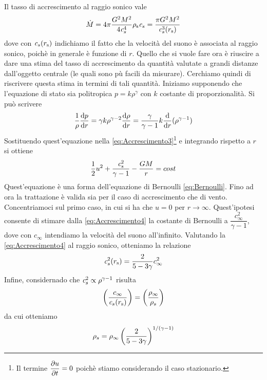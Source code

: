 Il tasso di accrescimento al raggio sonico vale
\begin{equation}
\dot{M} = 4\pi \dfrac{G^2M^2}{4\textit{c}_{s}^4} \rho_\mathrm{s} \textit{c}_{s} = \dfrac{\pi G^2 M^2}{\textit{c}_{s}^3(r_\mathrm{s})} \label{eq:Accrescimento7}
\end{equation}
dove con $\textit{c}_{s}(r_\mathrm{s})$ indichiamo il fatto che la velocità del suono è associata al raggio sonico, poichè in generale è funzione di $r$. Quello che si vuole fare ora è riuscire a dare una stima del tasso di accrescimento da quantità valutate a grandi distanze dall'oggetto centrale (le quali sono pù facili da misurare). Cerchiamo quindi di riscrivere questa stima in termini di tali quantità. 
Iniziamo supponendo che l'equazione di stato sia politropica $p = k\rho^\gamma$ con $k$ costante di proporzionalità. Si può scrivere
\begin{equation}
\dfrac{1}{\rho}\dfrac{\mathrm{d} {p}}{\mathrm{d} {r}} = \gamma k \rho^{\gamma-2}\dfrac{\mathrm{d} {\rho}}{\mathrm{d} {r}} = \dfrac{\gamma}{\gamma-1}k \dfrac{\mathrm{d} {}}{\mathrm{d} {r}}(\rho^{\gamma-1})
\end{equation}
Sostituendo quest'equazione nella \ref{eq:Accrescimento3}\footnote{Il termine $\dfrac{\partial {u}}{\partial {t}}=0$ poichè stiamo considerando il caso stazionario.} e integrando rispetto a $r$ si ottiene 
\begin{equation}
\dfrac{1}{2}u^2+\dfrac{\textit{c}_{s}^2}{\gamma-1}-\dfrac{GM}{r} = cost \label{eq:Accrescimento4}
\end{equation}
Quest'equazione è una forma dell'equazione di Bernoulli \ref{eq:Bernoulli}. Fino ad ora la trattazione è valida sia per il caso di accrescimento che di vento. Concentriamoci sul primo caso, in cui si ha che $u=0$ per $r\to\infty$. Quest'ipotesi consente di stimare dalla \ref{eq:Accrescimento4} la costante di Bernoulli a $\dfrac{c_\infty^2}{\gamma-1}$, dove con $c_\infty$ intendiamo la velocità del suono all'infinito. Valutando la \ref{eq:Accrescimento4} al raggio sonico, otteniamo la relazione
\begin{equation}
\textit{c}_{s}^2(r_\mathrm{s}) = \dfrac{2}{5-3\gamma}c_\infty^2 \label{eq:Accrescimento5}
\end{equation}
Infine, considernado che $\textit{c}_{s}^2\propto\rho^{\gamma-1}$ risulta
\begin{equation}
\left( \dfrac{c_\infty}{\textit{c}_{s}(r_\mathrm{s})} \right) = \left( \dfrac{\rho_\infty}{\rho_s} \right)
\end{equation}
da cui otteniamo
\begin{equation}
\rho_s = \rho_\infty \left( \dfrac{2}{5-3\gamma} \right)^{1/(\gamma-1)} \label{eq:Accrescimento6}
\end{equation}
